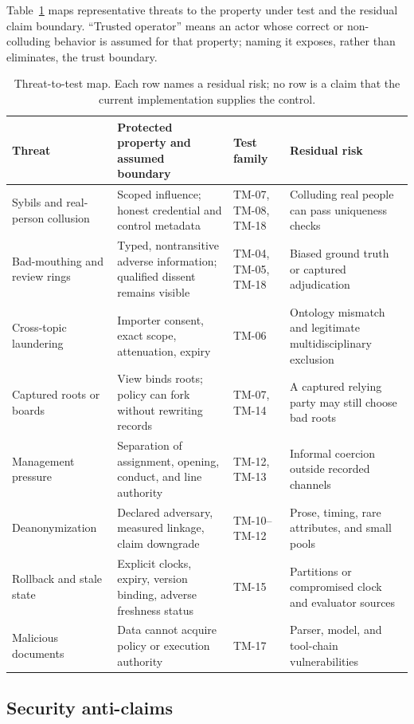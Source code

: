 \documentclass[11pt]{article}
\begin{document}
Table~\ref{tab:threats} maps representative threats to the property under test and
the residual claim boundary. ``Trusted operator'' means an actor whose correct or
non-colluding behavior is assumed for that property; naming it exposes, rather than
eliminates, the trust boundary.

\begin{table}[H]
\centering
\caption{Threat-to-test map. Each row names a residual risk; no row is a claim that
the current implementation supplies the control.}
\label{tab:threats}
\small
\begin{tabularx}{\textwidth}{>{\raggedright\arraybackslash}p{} X p{} p{}}
\toprule
Threat & Protected property and assumed boundary & Test family & Residual risk \\
\midrule
Sybils and real-person collusion & Scoped influence; honest credential and control metadata & TM-07, TM-08, TM-18 & Colluding real people can pass uniqueness checks \\
Bad-mouthing and review rings & Typed, nontransitive adverse information; qualified dissent remains visible & TM-04, TM-05, TM-18 & Biased ground truth or captured adjudication \\
Cross-topic laundering & Importer consent, exact scope, attenuation, expiry & TM-06 & Ontology mismatch and legitimate multidisciplinary exclusion \\
Captured roots or boards & View binds roots; policy can fork without rewriting records & TM-07, TM-14 & A captured relying party may still choose bad roots \\
Management pressure & Separation of assignment, opening, conduct, and line authority & TM-12, TM-13 & Informal coercion outside recorded channels \\
Deanonymization & Declared adversary, measured linkage, claim downgrade & TM-10--TM-12 & Prose, timing, rare attributes, and small pools \\
Rollback and stale state & Explicit clocks, expiry, version binding, adverse freshness status & TM-15 & Partitions or compromised clock and evaluator sources \\
Malicious documents & Data cannot acquire policy or execution authority & TM-17 & Parser, model, and tool-chain vulnerabilities \\
\bottomrule
\end{tabularx}
\end{table}

\subsection{Security anti-claims}
\end{document}
